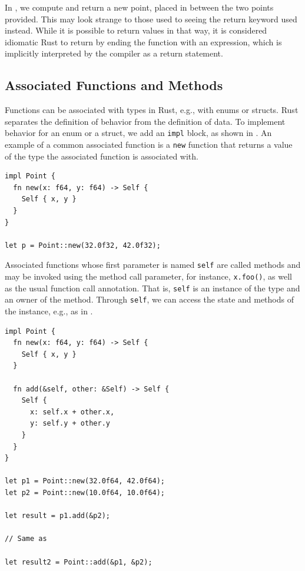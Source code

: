 \documentclass[paper=a4,%
  twoside,%
  BCOR4mm,%
  abstract=true,%
  toc=bibliography,%
  chapterprefix=true,%
  toc=bibliographynumbered,%
  open=right,%
  english,%
  pagesize=pdftex]{scrreprt}
\begin{document}
In , we compute and return a new point, placed in between the two points provided. This may look strange to those used to seeing the return keyword used instead. While it is possible to return values in that way, it is considered idiomatic Rust to return by ending the function with an expression, which is implicitly interpreted by the compiler as a return statement.

\subsection{Associated Functions and Methods}
Functions can be associated with types in Rust, e.g., with enums or structs. Rust separates the definition of behavior from the definition of data. To implement behavior for an enum or a struct, we add an \texttt{impl} block, as shown in . An example of a common associated function is a \texttt{new} function that returns a value of the type the associated function is associated with.

\begin{lstlisting}[style=boxed, caption={Associating behavior with the \texttt{Point} data type defined in \Cref{lst:example-struct-enum}}, label=lst:example-associated-function]
impl Point {
  fn new(x: f64, y: f64) -> Self {
    Self { x, y }
  }
}

let p = Point::new(32.0f32, 42.0f32);
\end{lstlisting}

Associated functions whose first parameter is named \texttt{self} are called methods and may be invoked using the method call parameter, for instance, \texttt{x.foo()}, as well as the usual function call annotation. That is, \texttt{self} is an instance of the type and an owner of the method. Through \texttt{self}, we can access the state and methods of the instance, e.g., as in .

\begin{lstlisting}[style=boxed, caption={Defining a method on \texttt{Point} data type from \Cref{lst:example-struct-enum}}, label=lst:example-method]
impl Point {
  fn new(x: f64, y: f64) -> Self {
    Self { x, y }
  }

  fn add(&self, other: &Self) -> Self {
    Self {
      x: self.x + other.x,
      y: self.y + other.y
    }
  }
}

let p1 = Point::new(32.0f64, 42.0f64);
let p2 = Point::new(10.0f64, 10.0f64);

let result = p1.add(&p2);

// Same as

let result2 = Point::add(&p1, &p2);
\end{lstlisting}
\end{document}
